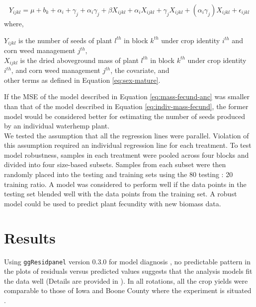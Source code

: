 \documentclass[
]{article}
\begin{document}
\begin{align} 
Y_{ijkl} = \mu + b_k + \alpha_i + \gamma_j +\alpha_i \gamma_j + \beta X_{ijkl} + \alpha_i X_{ijkl} + \gamma_j X_{ijkl} + (\alpha_i \gamma_j)X_{ijkl} + \epsilon_{ijkl} \label{eq:mass-fecund-anc}
\end{align}
where,

\(Y_{ijkl}\) is the number of seeds of plant \(l^{th}\) in block \(k^{th}\) under crop identity \(i^{th}\) and corn weed management \(j^{th}\),\\
\(X_{ijkl}\) is the dried aboveground mass of plant \(l^{th}\) in block \(k^{th}\) under crop identity \(i^{th}\), and corn weed management \(j^{th}\), the covariate, and\\
other terms as defined in Equation \eqref{eq:sex-mature}.

If the MSE of the model described in Equation \eqref{eq:mass-fecund-anc} was smaller than that of the model described in Equation \eqref{eq:indiv-mass-fecund}, the former model would be considered better for estimating the number of seeds produced by an individual waterhemp plant.\\  
We tested the assumption that all the regression lines were parallel. Violation of this assumption required an individual regression line for each treatment.
To test model robustness, samples in each treatment were pooled across four blocks and divided into four size-based subsets. Samples from each subset were then randomly placed into the testing and training sets using the 80 testing : 20 training ratio. A model was considered to perform well if the data points in the testing set blended well with the data points from the training set. A robust model could be used to predict plant fecundity with new biomass data.

\hypertarget{results}{%
\section*{Results}\label{results}}

Using \texttt{ggResidpanel} version 0.3.0 for model diagnosis \citep{goodeGgResidpanelPanelsInteractive2019}, no predictable pattern in the plots of residuals versus predicted values suggests that the analysis models fit the data well (Details are provided in \cite{nguyenCommonWaterhempIndividual2022}). In all rotations, all the crop yields were comparable to those of Iowa and Boone County where the experiment is situated \citep{nguyenWeedCommunityCompositioninpreparation, huntFossilEnergyUse2020}.
\end{document}
